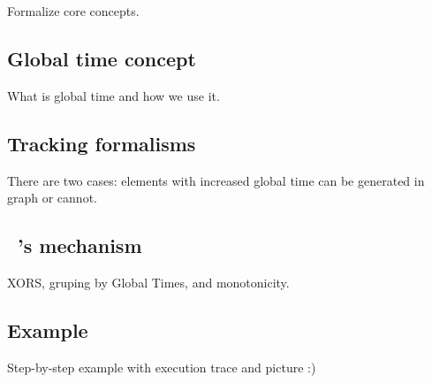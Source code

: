 \label {fs-acker-design}

Formalize core concepts.

\subsection{Global time concept}
What is global time and how we use it.

\subsection{Tracking formalisms}
There are two cases: elements with increased global time can be generated in graph or cannot.

\subsection{\tracker\ 's mechanism}
XORS, gruping by Global Times, and monotonicity. 

\subsection{Example}
Step-by-step example with execution trace and picture :)


